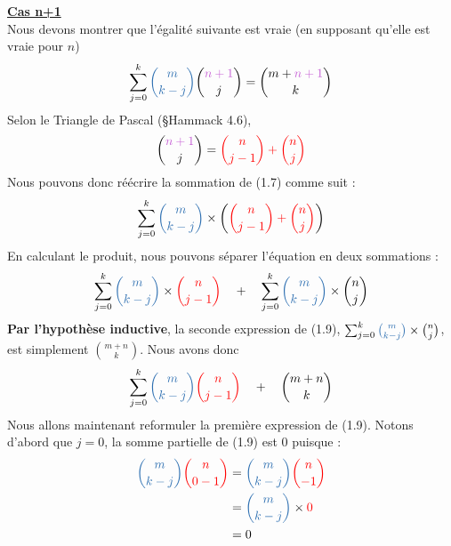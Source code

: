 \documentclass[16pt]{report}
\begin{document}
\begin{multicols*}{2}
\begin{Preuve*}{}{}
        \underline{\textbf{Cas n+1}}\\
        Nous devons montrer que l'égalité suivante est vraie (en supposant qu'elle est vraie pour $n$)
        \begin{align}
            \sum_{j=0}^{k} \textcolor{myb}{{m \choose k-j}} {\textcolor{myp}{n+1} \choose j} = {m+ \textcolor{myp}{n+1}\choose k}
        \end{align}
        Selon le Triangle de Pascal (\S Hammack 4.6), 
        \begin{align}
            {\textcolor{myp}{n+1} \choose j} = \textcolor{red}{{n \choose j - 1} + {n \choose j}}
        \end{align}
        Nous pouvons donc réécrire la sommation de (1.7) comme suit :
        \begin{align*}
            \sum_{j=0}^{k} \textcolor{myb}{{m \choose k-j}} \times
                \left( \textcolor{red}{{n \choose j - 1} + {n \choose j}} \right)
        \end{align*}
        En calculant le produit, nous pouvons séparer l'équation en deux sommations :
        \begin{align}
            \sum_{j=0}^{k} \textcolor{myb}{{m \choose k-j}} \times \textcolor{red}{{n \choose j - 1}} 
            \quad + \quad \sum_{j=0}^{k} \textcolor{myb}{{m \choose k-j}} \times {n \choose j}
        \end{align}
        \textbf{Par l'hypothèse inductive}, la seconde expression de (1.9),
        $\sum_{j=0}^{k} \textcolor{myb}{{m \choose k-j}} \times {n \choose j}$, est simplement $m + n \choose k$. 
        Nous avons donc 
        \begin{align}
            \sum_{j=0}^{k} \textcolor{myb}{{m \choose k-j}}\textcolor{red}{{n \choose j - 1}} 
            \quad + \quad {m + n \choose k}
        \end{align}
        Nous allons maintenant reformuler la première expression de (1.9). Notons d'abord que 
        $j = 0$, la somme partielle de (1.9) est $0$ puisque : 
        \begin{align*}
            \textcolor{myb}{{m \choose k-j}}\textcolor{red}{{n \choose 0 - 1}} &=  
            \textcolor{myb}{{m \choose k-j}}\textcolor{red}{{n \choose - 1}} \\ &=
            \textcolor{myb}{{m \choose k-j}} \times \textcolor{red}{0} \\ &= 0 
        \end{align*}


\end{Preuve*}
\end{multicols*}
\end{document}
